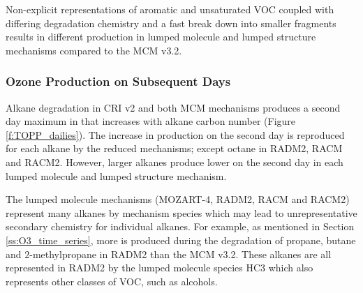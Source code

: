 Non-explicit representations of aromatic and unsaturated VOC coupled with differing degradation chemistry and a fast break down into smaller fragments results in different  production in lumped molecule and lumped structure mechanisms compared to the MCM v3.2.
%
\subsubsection{Ozone Production on Subsequent Days} \label{sss:profiles} %
%
Alkane degradation in CRI v2 and both MCM mechanisms produces a second day maximum in  that increases with alkane carbon number (Figure \ref{f:TOPP_dailies}).
The increase in  production on the second day is reproduced for each alkane by the reduced mechanisms; except octane in RADM2, RACM and RACM2.
However, larger alkanes produce lower  on the second day in each lumped molecule and lumped structure mechanism.

The lumped molecule mechanisms (MOZART-4, RADM2, RACM and RACM2) represent many alkanes by mechanism species which may lead to unrepresentative secondary chemistry for individual alkanes.
For example, as mentioned in Section \ref{ss:O3_time_series}, more  is produced during the degradation of propane, butane and $2$-methylpropane in RADM2 than the MCM v3.2.
These alkanes are all represented in RADM2 by the lumped molecule species HC3 which also represents other classes of VOC, such as alcohols.

